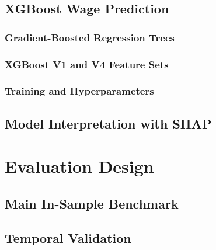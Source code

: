 \documentclass[12pt,a4paper,oneside,titlepage]{book}
\newif\ifthesisdraft
\newcommand{\draftnote}[1]{%
  \ifthesisdraft
    \par\noindent\colorbox{yellow!20}{%
      \parbox{0.94\textwidth}{\textbf{Draft note:} #1}%
    }\par
  \fi
}
\begin{document}
\section{XGBoost Wage Prediction}
\label{sec:xgboost}

\subsection{Gradient-Boosted Regression Trees}
\draftnote{Explain the prediction function, loss, regularisation, and sequential tree construction at the level needed for the thesis.}

\subsection{XGBoost V1 and V4 Feature Sets}
\draftnote{Explain the restricted V1 and richer V4 predictor sets. Clearly exclude LZ-derived information from predictors and explain which wage-history and employment variables distinguish XGBoost V4.}

\subsection{Training and Hyperparameters}
\draftnote{Document the objective, hyperparameters, missing-value handling, random seed, software, and computational environment.}

\section{Model Interpretation with SHAP}
\label{sec:shap}
\draftnote{Introduce Shapley values and SHAP, distinguish local from global interpretation, and explain the summary and importance plots used later.}

\chapter{Evaluation Design}
\label{ch:evaluation}

\section{Main In-Sample Benchmark}
\draftnote{Explain that the common-sample in-sample comparison places Tobit and XGBoost on the same footing as the classical benchmark. Do not present it as out-of-sample forecasting evidence.}

\section{Temporal Validation}
\draftnote{Define the temporal split: train on 1994--2011 and evaluate on the 2012 holdout. Explain what this exercise adds to the in-sample benchmark.}
\end{document}
